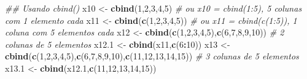 \documentclass[
]{book}
\newenvironment{Shaded}{\begin{snugshade}}{\end{snugshade}}
\newcommand{\CommentTok}[1]{\textcolor[rgb]{0.56,0.35,0.01}{\textit{#1}}}
\newcommand{\DecValTok}[1]{\textcolor[rgb]{0.00,0.00,0.81}{#1}}
\newcommand{\FloatTok}[1]{\textcolor[rgb]{0.00,0.00,0.81}{#1}}
\newcommand{\KeywordTok}[1]{\textcolor[rgb]{0.13,0.29,0.53}{\textbf{#1}}}
\newcommand{\NormalTok}[1]{#1}
\newcommand{\OperatorTok}[1]{\textcolor[rgb]{0.81,0.36,0.00}{\textbf{#1}}}
\newcommand{\StringTok}[1]{\textcolor[rgb]{0.31,0.60,0.02}{#1}}
\begin{document}
\begin{Shaded}
\begin{Highlighting}[]
\CommentTok{## Usando cbind()}
\NormalTok{x10 <-}\StringTok{ }\KeywordTok{cbind}\NormalTok{(}\DecValTok{1}\NormalTok{,}\DecValTok{2}\NormalTok{,}\DecValTok{3}\NormalTok{,}\DecValTok{4}\NormalTok{,}\DecValTok{5}\NormalTok{) }\CommentTok{# ou x10 = cbind(1:5), 5 colunas com 1 elemento cada}
\NormalTok{x11 <-}\StringTok{ }\KeywordTok{cbind}\NormalTok{(}\KeywordTok{c}\NormalTok{(}\DecValTok{1}\NormalTok{,}\DecValTok{2}\NormalTok{,}\DecValTok{3}\NormalTok{,}\DecValTok{4}\NormalTok{,}\DecValTok{5}\NormalTok{)) }\CommentTok{# ou x11 = cbind(c(1:5)), 1 coluna com 5 elementos cada }
\NormalTok{x12 <-}\StringTok{ }\KeywordTok{cbind}\NormalTok{(}\KeywordTok{c}\NormalTok{(}\DecValTok{1}\NormalTok{,}\DecValTok{2}\NormalTok{,}\DecValTok{3}\NormalTok{,}\DecValTok{4}\NormalTok{,}\DecValTok{5}\NormalTok{),}\KeywordTok{c}\NormalTok{(}\DecValTok{6}\NormalTok{,}\DecValTok{7}\NormalTok{,}\DecValTok{8}\NormalTok{,}\DecValTok{9}\NormalTok{,}\DecValTok{10}\NormalTok{)) }\CommentTok{# 2 colunas de 5 elementos}
\NormalTok{x12}\FloatTok{.1}\NormalTok{ <-}\StringTok{ }\KeywordTok{cbind}\NormalTok{(x11,}\KeywordTok{c}\NormalTok{(}\DecValTok{6}\OperatorTok{:}\DecValTok{10}\NormalTok{))}
\NormalTok{x13 <-}\StringTok{ }\KeywordTok{cbind}\NormalTok{(}\KeywordTok{c}\NormalTok{(}\DecValTok{1}\NormalTok{,}\DecValTok{2}\NormalTok{,}\DecValTok{3}\NormalTok{,}\DecValTok{4}\NormalTok{,}\DecValTok{5}\NormalTok{),}\KeywordTok{c}\NormalTok{(}\DecValTok{6}\NormalTok{,}\DecValTok{7}\NormalTok{,}\DecValTok{8}\NormalTok{,}\DecValTok{9}\NormalTok{,}\DecValTok{10}\NormalTok{),}\KeywordTok{c}\NormalTok{(}\DecValTok{11}\NormalTok{,}\DecValTok{12}\NormalTok{,}\DecValTok{13}\NormalTok{,}\DecValTok{14}\NormalTok{,}\DecValTok{15}\NormalTok{)) }\CommentTok{# 3 colunas de 5 elementos}
\NormalTok{x13}\FloatTok{.1}\NormalTok{ <-}\StringTok{ }\KeywordTok{cbind}\NormalTok{(x12}\FloatTok{.1}\NormalTok{,}\KeywordTok{c}\NormalTok{(}\DecValTok{11}\NormalTok{,}\DecValTok{12}\NormalTok{,}\DecValTok{13}\NormalTok{,}\DecValTok{14}\NormalTok{,}\DecValTok{15}\NormalTok{))}
\end{Highlighting}
\end{Shaded}
\end{document}
